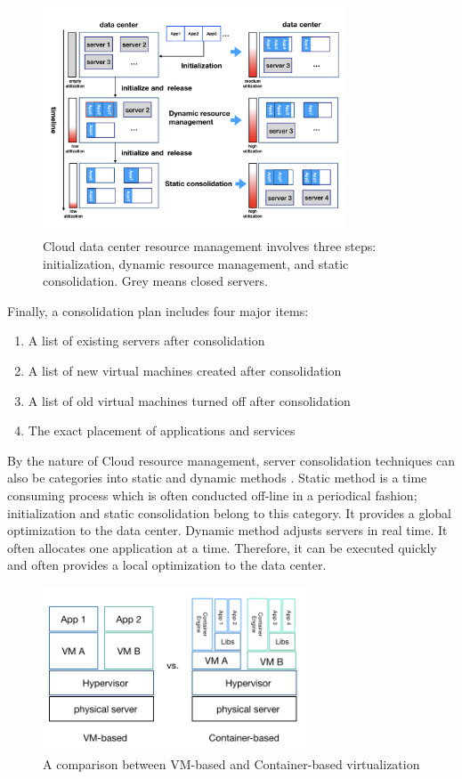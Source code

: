 \begin{figure}
	\centering
	\includegraphics[width=0.8\textwidth]{pics/resource_management.png}
	\caption{Cloud data center resource management involves three steps: initialization, dynamic resource management, and static consolidation. Grey means closed servers.}
	\label{fig:management}
\end{figure} 

Finally, a consolidation plan includes four major items:
			\begin{enumerate}
				\item A list of existing servers after consolidation
				\item A list of new virtual machines created after consolidation
				\item A list of old virtual machines turned off after consolidation
				\item The exact placement of applications and services
			\end{enumerate}

By the nature of Cloud resource management, server consolidation techniques can also be categories into static and dynamic methods \cite{Xiao:2015ik, Verma:2009wi}. Static method is a time consuming process which is often conducted off-line in a periodical fashion; initialization and static consolidation belong to this category. It provides a global optimization to the data center. Dynamic method adjusts servers in real time. It often allocates one application at a time. Therefore, it can be executed quickly and often provides a local optimization to the data center.

\vspace{10mm}
\begin{figure}
	\centering
	\includegraphics[width=0.7\textwidth]{pics/comparison.png}
	\caption{A comparison between VM-based and Container-based virtualization}
	\label{fig:comparison}
\end{figure}

